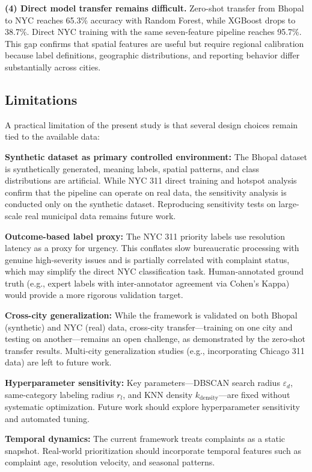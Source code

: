 \documentclass[12pt,onecolumn,draftclsnofoot]{IEEEtran}
\begin{document}
\textbf{(4) Direct model transfer remains difficult.} Zero-shot transfer from Bhopal to NYC reaches 65.3\% accuracy with Random Forest, while XGBoost drops to 38.7\%. Direct NYC training with the same seven-feature pipeline reaches 95.7\%. This gap confirms that spatial features are useful but require regional calibration because label definitions, geographic distributions, and reporting behavior differ substantially across cities.

\subsection{Limitations}

A practical limitation of the present study is that several design choices remain tied to the available data:

\textbf{Synthetic dataset as primary controlled environment:} The Bhopal dataset is synthetically generated, meaning labels, spatial patterns, and class distributions are artificial. While NYC 311 direct training and hotspot analysis confirm that the pipeline can operate on real data, the sensitivity analysis is conducted only on the synthetic dataset. Reproducing sensitivity tests on large-scale real municipal data remains future work.

\textbf{Outcome-based label proxy:} The NYC 311 priority labels use resolution latency as a proxy for urgency. This conflates slow bureaucratic processing with genuine high-severity issues and is partially correlated with complaint status, which may simplify the direct NYC classification task. Human-annotated ground truth (e.g., expert labels with inter-annotator agreement via Cohen's Kappa) would provide a more rigorous validation target.

\textbf{Cross-city generalization:} While the framework is validated on both Bhopal (synthetic) and NYC (real) data, cross-city transfer---training on one city and testing on another---remains an open challenge, as demonstrated by the zero-shot transfer results. Multi-city generalization studies (e.g., incorporating Chicago 311 data) are left to future work.

\textbf{Hyperparameter sensitivity:} Key parameters---DBSCAN search radius $\varepsilon_d$, same-category labeling radius $r_l$, and KNN density $k_{\text{density}}$---are fixed without systematic optimization. Future work should explore hyperparameter sensitivity and automated tuning.

\textbf{Temporal dynamics:} The current framework treats complaints as a static snapshot. Real-world prioritization should incorporate temporal features such as complaint age, resolution velocity, and seasonal patterns.
\end{document}
